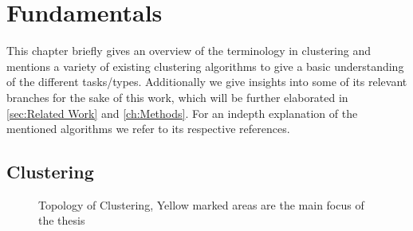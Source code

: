 \chapter{Fundamentals}

This chapter briefly gives an overview of the terminology in clustering and mentions a variety of existing clustering algorithms to give a basic understanding of the different tasks/types. Additionally we give insights into some of its relevant branches for the sake of this work, which will be further elaborated in \autoref{sec:Related Work} and \autoref{ch:Methods}. For an indepth explanation of the mentioned algorithms we refer to its respective references.

\section{Clustering}\label{sec:clu}
\cite{kriegel2009clustering}

\begin{figure}
    \centering
    \caption{Topology of Clustering, Yellow marked areas are the main focus of the thesis}
    \label{fig:my_label}
\end{figure}

